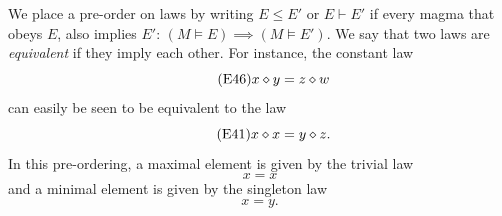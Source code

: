 We place a pre-order on laws by writing $E \leq E'$ or $E \vdash E'$ if every magma that obeys $E$, also implies $E'$: $(M \models E) \implies (M \models E')$. We say that two laws are \emph{equivalent} if they imply each other. For instance, the constant law
\begin{equation}\label{eq46}\tag{E46}
x \diamond y = z \diamond w
\end{equation}
can easily be seen to be equivalent to the law
\begin{equation}\label{eq41}\tag{E41}
x \diamond x = y \diamond z.
\end{equation}
In this pre-ordering, a maximal element is given by the trivial law
\begin{equation}\label{eq1}\tag{E1}
x = x
\end{equation}
and a minimal element is given by the singleton law
\begin{equation}\label{eq2}\tag{E2}
x = y.
\end{equation}

